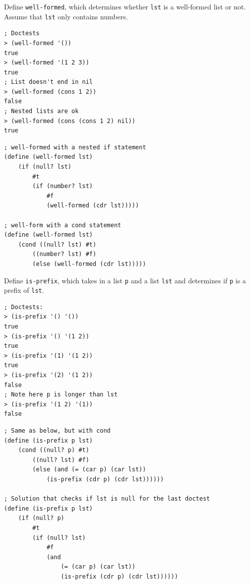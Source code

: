 \documentclass{exam}
\begin{document}
\begin{questions}
\begin{blocksection}
\question Define \texttt{well-formed}, which determines whether \texttt{lst} is a well-formed list or not. Assume that \texttt{lst} only contains numbers.

\begin{lstlisting}
; Doctests
> (well-formed '())
true
> (well-formed '(1 2 3))
true
; List doesn't end in nil
> (well-formed (cons 1 2))
false
; Nested lists are ok
> (well-formed (cons (cons 1 2) nil))
true
\end{lstlisting}

\begin{solution}[0.75in]
\begin{lstlisting}
; well-formed with a nested if statement
(define (well-formed lst)
    (if (null? lst)
        #t
        (if (number? lst)
            #f
            (well-formed (cdr lst)))))

; well-form with a cond statement
(define (well-formed lst)
    (cond ((null? lst) #t)
        ((number? lst) #f)
        (else (well-formed (cdr lst)))))
\end{lstlisting}
\end{solution}
\end{blocksection}

\begin{blocksection}
\question Define \texttt{is-prefix}, which takes in a list \texttt{p} and a list \texttt{lst} and determines if \texttt{p} is a prefix of \texttt{lst}.

\begin{lstlisting}
; Doctests:
> (is-prefix '() '())
true
> (is-prefix '() '(1 2))
true
> (is-prefix '(1) '(1 2))
true
> (is-prefix '(2) '(1 2))
false
; Note here p is longer than lst
> (is-prefix '(1 2) '(1))
false
\end{lstlisting}

\begin{solution}[0.5in]
\begin{lstlisting}
; Same as below, but with cond
(define (is-prefix p lst)
    (cond ((null? p) #t)
        ((null? lst) #f)
        (else (and (= (car p) (car lst))
            (is-prefix (cdr p) (cdr lst))))))

; Solution that checks if lst is null for the last doctest
(define (is-prefix p lst)
    (if (null? p)
        #t
        (if (null? lst)
            #f
            (and
                (= (car p) (car lst))
                (is-prefix (cdr p) (cdr lst))))))
\end{lstlisting}
\end{solution}
\end{blocksection}

\end{questions}

\end{document}
